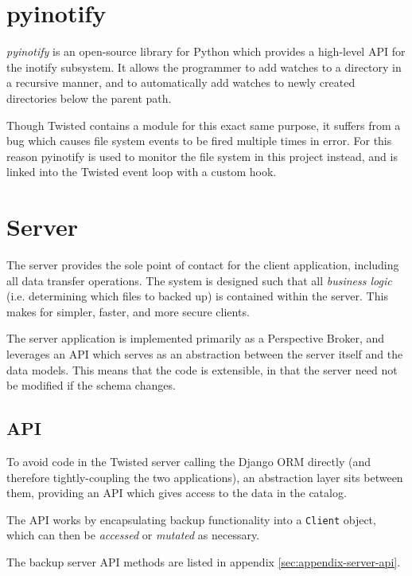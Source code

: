 \section{pyinotify}
\label{sec:implementation-pyinotify}

\emph{pyinotify} is an open-source library for Python which provides
a high-level API for the inotify subsystem. It allows the programmer to add
watches to a directory in a recursive manner, and to automatically add watches
to newly created directories below the parent path.

Though Twisted contains a module for this exact same purpose, it suffers from
a bug which causes file system events to be fired multiple times in error. For
this reason pyinotify is used to monitor the file system in this project
instead, and is linked into the Twisted event loop with a custom hook.

\section{Server}
\label{sec:implementation-server}

The server provides the sole point of contact for the client application,
including all data transfer operations. The system is designed such that all
\emph{business logic} (i.e. determining which files to backed up) is contained
within the server. This makes for simpler, faster, and more secure clients.

The server application is implemented primarily as a Perspective Broker, and
leverages an API which serves as an abstraction between the server itself and
the data models. This means that the code is extensible, in that the server
need not be modified if the schema changes.

\subsection{API}
\label{sec:implementation-server-api}

To avoid code in the Twisted server calling the Django ORM directly (and
therefore tightly-coupling the two applications), an abstraction layer sits
between them, providing an API which gives access to the data in the catalog.

The API works by encapsulating backup functionality into a \verb!Client!
object, which can then be \emph{accessed} or \emph{mutated} as necessary.

The backup server API methods are listed in appendix
\ref{sec:appendix-server-api}.


